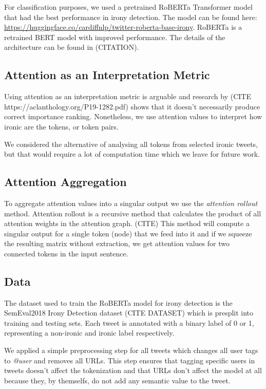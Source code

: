 \documentclass[10pt, a4paper]{article}
\begin{document}
For classification purposes, we used a pretrained RoBERTa Transformer model that had the best performance in irony detection.
The model can be found here: \url{https://huggingface.co/cardiffnlp/twitter-roberta-base-irony}.
RoBERTa is a retrained BERT model with improved performance. The details of the architecture can be found in (CITATION). 

\subsection{Attention as an Interpretation Metric}

Using attention as an interpretation metric is arguable and research by (CITE https://aclanthology.org/P19-1282.pdf) shows that it doesn't necessarily produce correct importance ranking.
Nonetheless, we use attention values to interpret how ironic are the tokens, or token pairs.

We considered the alternative of analysing all tokens from selected ironic tweets, but that would require a lot of computation time which we leave for future work.

\subsection{Attention Aggregation}
\label{sec:attaggr}

To aggregate attention values into a singular output we use the \textit{attention rollout} method.
Attention rollout is a recursive method that calculates the product of all attention weights in the attention graph. (CITE)
This method will compute a singular output for a single token (node) that we feed into it and if we squeeze the resulting matrix without extraction, we get attention values for two connected tokens in the input sentence.

\subsection{Data}

The dataset used to train the RoBERTa model for irony detection is the SemEval2018 Irony Detection dataset (CITE DATASET) which is presplit into training and testing sets.
Each tweet is annotated with a binary label of 0 or 1, representing a non-ironic and ironic label respectively.

We applied a simple preprocessing step for all tweets which changes all user tags to \textit{@user} and removes all URLs.
This step ensures that tagging specific users in tweets doesn't affect the tokenization and that URLs don't affect the model at all because they, by themselfs, do not add any semantic value to the tweet.
\end{document}
